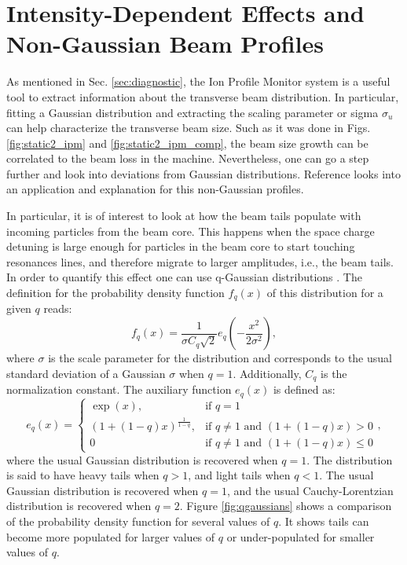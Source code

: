 \section{\label{sec:qgaussian}Intensity-Dependent Effects and Non-Gaussian Beam Profiles}

As mentioned in Sec. \ref{sec:diagnostic}, the Ion Profile Monitor system is a useful tool to extract information about the transverse beam distribution. In particular, fitting a Gaussian distribution and extracting the scaling parameter or sigma $\sigma_u$ can help characterize the transverse beam size. Such as it was done in Figs. \ref{fig:static2_ipm} and \ref{fig:static2_ipm_comp}, the beam size growth can be correlated to the beam loss in the machine. Nevertheless, one can go a step further and look into deviations from Gaussian distributions. Reference \cite{nongaussian} looks into an application and explanation for this non-Gaussian profiles.

In particular, it is of interest to look at how the beam tails populate with incoming particles from the beam core. This happens when the space charge detuning is large enough for particles in the beam core to start touching resonances lines, and therefore migrate to larger amplitudes, i.e., the beam tails. In order to quantify this effect one can use q-Gaussian distributions \cite{nongaussian,qgaussian}. The definition for the probability density function $f_q(x)$ of this distribution for a given $q$ reads:
\begin{equation}
    \label{eq:qgaussian}
    f_q(x)=\frac{1}{\sigma C_q \sqrt{2}}e_q\left( -\frac{x^2}{2 \sigma^2}\right),
\end{equation}
where $\sigma$ is the scale parameter for the distribution and corresponds to the usual standard deviation of a Gaussian $\sigma$ when $q=1$. Additionally, $C_q$ is the normalization constant. The auxiliary function $e_q(x)$ is defined as:
\begin{equation}
    \label{eq:eqqGaussian}
    e_q(x)= \left\{
        \begin{array}{cl} 
            \exp{(x)}, & \text{if  } q = 1\\
            \left( 1+\left( 1-q \right)x\right)^{\frac{1}{1-q}}, & \text{if  } q \neq 1 \text{ and } \left( 1+\left( 1-q\right)x\right)>0\\
            0  & \text{if  } q \neq 1 \text{ and } \left( 1+\left( 1-q\right)x\right) \leq 0 
        \end{array} 
    \right.,
\end{equation}
where the usual Gaussian distribution is recovered when $q=1$. The distribution is said to have heavy tails when $q>1$, and light tails when $q<1$. The usual Gaussian distribution is recovered when $q=1$, and the usual Cauchy-Lorentzian distribution is recovered when $q=2$. Figure \ref{fig:qgaussians} shows a comparison of the probability density function for several values of $q$. It shows tails can become more populated for larger values of $q$ or under-populated for smaller values of $q$.  

